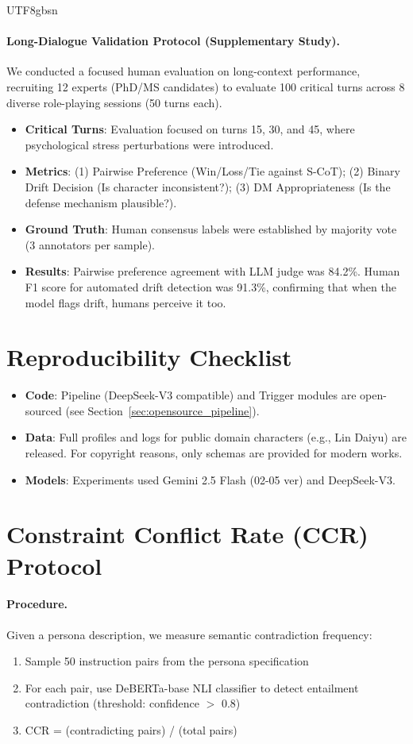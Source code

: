 \documentclass[11pt]{article}
\begin{document}
\begin{CJK*}{UTF8}{gbsn}
\paragraph{Long-Dialogue Validation Protocol (Supplementary Study).}
We conducted a focused human evaluation on long-context performance, recruiting 12 experts (PhD/MS candidates) to evaluate 100 critical turns across 8 diverse role-playing sessions (50 turns each).
\begin{itemize}
    \item \textbf{Critical Turns}: Evaluation focused on turns 15, 30, and 45, where psychological stress perturbations were introduced.
    \item \textbf{Metrics}: (1) Pairwise Preference (Win/Loss/Tie against S-CoT); (2) Binary Drift Decision (Is character inconsistent?); (3) DM Appropriateness (Is the defense mechanism plausible?).
    \item \textbf{Ground Truth}: Human consensus labels were established by majority vote (3 annotators per sample).
    \item \textbf{Results}: Pairwise preference agreement with LLM judge was 84.2\%. Human F1 score for automated drift detection was 91.3\%, confirming that when the model flags drift, humans perceive it too.
\end{itemize}

\section{Reproducibility Checklist}
\label{sec:repro_checklist}
\begin{itemize}
    \item \textbf{Code}: Pipeline (DeepSeek-V3 compatible) and Trigger modules are open-sourced (see Section~\ref{sec:opensource_pipeline}).
    \item \textbf{Data}: Full profiles and logs for public domain characters (e.g., Lin Daiyu) are released. For copyright reasons, only schemas are provided for modern works.
    \item \textbf{Models}: Experiments used Gemini 2.5 Flash (02-05 ver) and DeepSeek-V3.
\end{itemize}

\section{Constraint Conflict Rate (CCR) Protocol}
\label{sec:ccr_details}

\paragraph{Procedure.} Given a persona description, we measure semantic contradiction frequency:
\begin{enumerate}
    \item Sample 50 instruction pairs from the persona specification
    \item For each pair, use DeBERTa-base NLI classifier to detect entailment contradiction (threshold: confidence $>$ 0.8)
    \item CCR = (contradicting pairs) / (total pairs)
\end{enumerate}


\end{CJK*}
\end{document}
